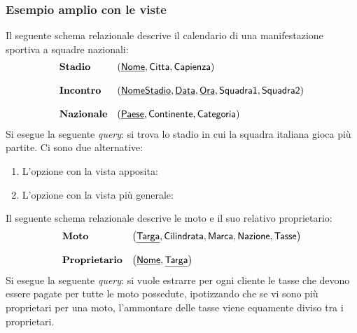 \documentclass[a4paper]{article}
\begin{document}
	\subsubsection{Esempio amplio con le viste}
	
	Il seguente schema relazionale descrive il calendario di una manifestazione sportiva a squadre nazionali:
	\begin{equation*}
		\begin{array}{ll}
			\textbf{Stadio} 	& \left( \textsf{\underline{Nome}}, \textsf{Citta}, \textsf{Capienza} \right) \\
			\\
			\textbf{Incontro} 	& \left( \textsf{\underline{NomeStadio}}, \textsf{\underline{Data}}, \textsf{\underline{Ora}}, \textsf{Squadra1}, \textsf{Squadra2} \right) \\
			\\
			\textbf{Nazionale} 	& \left( \textsf{\underline{Paese}}, \textsf{Continente}, \textsf{Categoria} \right) \\
		\end{array}
	\end{equation*}
	Si esegue la seguente \emph{query}: si trova lo stadio in cui la squadra italiana gioca più partite. Ci sono due alternative:
	\begin{enumerate}
		\item L'opzione con la vista apposita:
		
		
		\item L'opzione con la vista più generale:
		
	\end{enumerate}\newpage
	
	\noindent
	Il seguente schema relazionale descrive le moto e il suo relativo proprietario:
	\begin{equation*}
		\begin{array}{ll}
			\textbf{Moto} 			& \left( \textsf{\underline{Targa}}, \textsf{Cilindrata}, \textsf{Marca}, \textsf{Nazione}, \textsf{Tasse} \right) \\
			\\
			\textbf{Proprietario}	& \left( \textsf{\underline{Nome}}, \textsf{\underline{Targa}}\right) \\
		\end{array}
	\end{equation*}
	Si esegue la seguente \emph{query}: si vuole estrarre per ogni cliente le tasse che devono essere pagate per tutte le moto possedute, ipotizzando che se vi sono più proprietari per una moto, l'ammontare delle tasse viene equamente diviso tra i proprietari.
	\newpage
	
\end{document}
